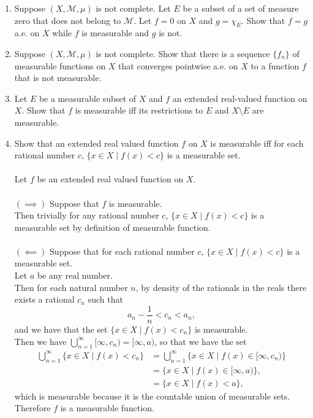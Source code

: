 \begin{enumerate}
    \item Suppose $(X,\mathcal{M},\mu)$ is not complete.
    Let $E$ be a subset of a set of measure zero that does not belong to $\mathcal{M}$.
    Let $f=0$ on $X$ and $g=\chi_E$.
    Show that $f=g$ a.e. on $X$ while $f$ is measurable and $g$ is not.
    \item Suppose $(X,\mathcal{M},\mu)$ is not complete.
    Show that there is a sequence $\{f_n\}$ of measurable functions on $X$ that converges pointwise a.e. on $X$ to a function $f$ that is not measurable.
    \item Let $E$ be a measurable subset of $X$ and $f$ an extended real-valued function on $X$.
    Show that $f$ is measurable iff its restrictions to $E$ and $X\setminus E$ are measurable.
    \item Show that an extended real valued function $f$ on $X$ is measurable iff for each rational number $c$, $\{x\in X\mid f(x)<c\}$ is a measurable set.\\
    \\Let $f$ be an extended real valued function on $X$.\\
    \\$(\implies)$ Suppose that $f$ is measurable.
    \\Then trivially for any rational number $c$, $\{x\in X\mid f(x)<c\}$ is a measurable set by definition of measurable function.\\
    \\$(\impliedby)$ Suppose that for each rational number $c$, $\{x\in X\mid f(x)<c\}$ is a measurable set.
    \\Let $a$ be any real number.
    \\Then for each natural number $n$, by density of the rationals in the reals there exists a rational $c_n$ such that 
    \[
        a_n-\frac{1}{n}<c_n< a_n,
    \]
    and we have that the set $\{x\in X\mid f(x)<c_n\}$ is measurable.
    \\Then we have $\bigcup_{n=1}^\infty[\infty,c_n)=[\infty,a)$, so that we have the set
    \begin{align*}
        \bigcup_{n=1}^\infty\{x\in X\mid f(x)<c_n\}
        &=\bigcup_{n=1}^\infty\{x\in X\mid f(x)\in[\infty,c_n)\}\\
        &=\{x\in X\mid f(x)\in[\infty,a)\},\\
        &=\{x\in X\mid f(x)<a\},
    \end{align*}
    which is measurable because it is the countable union of measurable sets.
    \\Therefore $f$ is a measurable function.

\end{enumerate}
